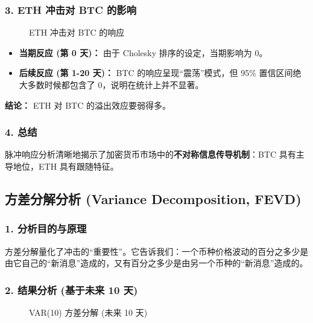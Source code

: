 \documentclass[a4paper]{ctexart}
\begin{document}
	\subsubsection{3. ETH 冲击对 BTC 的影响}
	\begin{figure}[htbp]
		\centering
		\caption{ETH 冲击对 BTC 的响应}
		\label{fig:irf_eth_to_btc}
	\end{figure}
	\begin{itemize}
		\item \textbf{当期反应 (第 0 天)：} 由于 Cholesky 排序的设定，当期影响为 0。
		\item \textbf{后续反应 (第 1-20 天)：} BTC 的响应呈现“震荡”模式，但 95\% 置信区间绝大多数时候都包含了 0，说明在统计上并不显著。
	\end{itemize}
	\textbf{结论：} ETH 对 BTC 的溢出效应要弱得多。
	
	\subsubsection{4. 总结}
	脉冲响应分析清晰地揭示了加密货币市场中的\textbf{不对称信息传导机制}：BTC 具有主导地位，ETH 具有跟随特征。
	
	\subsection{方差分解分析 (Variance Decomposition, FEVD)}
	\subsubsection{1. 分析目的与原理}
	方差分解量化了冲击的“重要性”。它告诉我们：一个币种价格波动的百分之多少是由它自己的“新消息”造成的，又有百分之多少是由另一个币种的“新消息”造成的。
	
	\subsubsection{2. 结果分析 (基于未来 10 天)}
	\begin{figure}[htbp]
		\centering
		\caption{VAR(10) 方差分解 (未来 10 天)}
		\label{fig:fevd}
	\end{figure}
	
\end{document}
